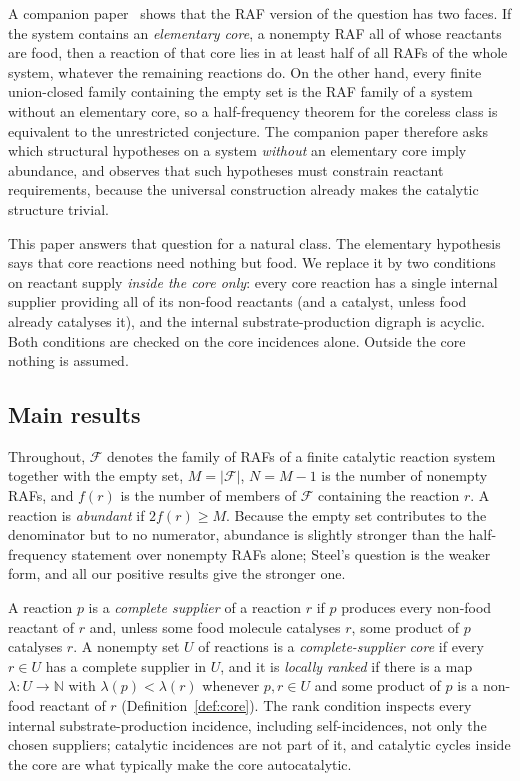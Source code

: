 \documentclass[11pt,a4paper]{article}
\theoremstyle{plain}
\theoremstyle{definition}
\theoremstyle{remark}
\newcommand{\FF}{\mathcal F}
\newcommand{\N}{\mathbb N}
\begin{document}
A companion paper~\cite{elementary2026} shows that the RAF version of the question has two faces. If the system contains an \emph{elementary core}, a nonempty RAF all of whose reactants are food, then a reaction of that core lies in at least half of all RAFs of the whole system, whatever the remaining reactions do. On the other hand, every finite union-closed family containing the empty set is the RAF family of a system without an elementary core, so a half-frequency theorem for the coreless class is equivalent to the unrestricted conjecture. The companion paper therefore asks which structural hypotheses on a system \emph{without} an elementary core imply abundance, and observes that such hypotheses must constrain reactant requirements, because the universal construction already makes the catalytic structure trivial.

This paper answers that question for a natural class. The elementary hypothesis says that core reactions need nothing but food. We replace it by two conditions on reactant supply \emph{inside the core only}: every core reaction has a single internal supplier providing all of its non-food reactants (and a catalyst, unless food already catalyses it), and the internal substrate-production digraph is acyclic. Both conditions are checked on the core incidences alone. Outside the core nothing is assumed.

\subsection{Main results}

Throughout, $\FF$ denotes the family of RAFs of a finite catalytic reaction system together with the empty set, $M=|\FF|$, $N=M-1$ is the number of nonempty RAFs, and $f(r)$ is the number of members of $\FF$ containing the reaction $r$. A reaction is \emph{abundant} if $2f(r)\ge M$. Because the empty set contributes to the denominator but to no numerator, abundance is slightly stronger than the half-frequency statement over nonempty RAFs alone; Steel's question is the weaker form, and all our positive results give the stronger one.

A reaction $p$ is a \emph{complete supplier} of a reaction $r$ if $p$ produces every non-food reactant of $r$ and, unless some food molecule catalyses $r$, some product of $p$ catalyses $r$. A nonempty set $U$ of reactions is a \emph{complete-supplier core} if every $r\in U$ has a complete supplier in $U$, and it is \emph{locally ranked} if there is a map $\lambda:U\to\N$ with $\lambda(p)<\lambda(r)$ whenever $p,r\in U$ and some product of $p$ is a non-food reactant of $r$ (Definition~\ref{def:core}). The rank condition inspects every internal substrate-production incidence, including self-incidences, not only the chosen suppliers; catalytic incidences are not part of it, and catalytic cycles inside the core are what typically make the core autocatalytic.
\end{document}
